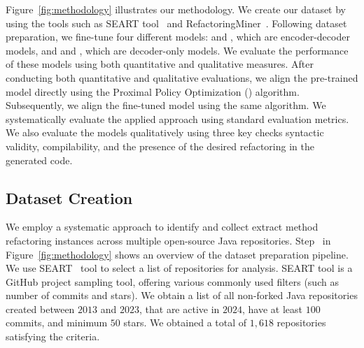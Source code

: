 Figure~\ref{fig:methodology} illustrates our methodology. We create our dataset by using the tools such as SEART tool~\cite{seart2021data} and RefactoringMiner~\cite{Tsantalis:TSE:2020:RefactoringMiner2.0, Tsantalis:ICSE:2018:RefactoringMiner}.
Following dataset preparation, we fine-tune four different models: \codetf{} and \plbart{}, which are encoder-decoder models, and \codegpt{} and \codegen{}, which are decoder-only models. We evaluate the performance of these models using both quantitative and qualitative measures. After conducting both quantitative and qualitative evaluations, we align the pre-trained model directly using the Proximal Policy Optimization (\ppo{}) algorithm. Subsequently, we align the fine-tuned model using the same \ppo{} algorithm.
We systematically evaluate the applied approach using standard evaluation metrics. We also evaluate the models qualitatively using three key checks \ie{} syntactic validity, compilability, and the presence of the desired refactoring in the generated code.

\subsection{Dataset Creation} \label{section:dataset_creation}

We employ a systematic approach to identify and collect extract method refactoring instances across multiple open-source Java repositories. Step~ in Figure~\ref{fig:methodology} shows an overview of the dataset preparation pipeline. 
We use SEART~\cite{seart2021data} tool to select a  list of repositories for analysis. 
SEART tool is a GitHub project sampling tool,
offering various commonly used filters (such as number of commits and stars).
We obtain a list of all non-forked Java repositories 
created between $2013$ and $2023$, that are active in $2024$, 
have at
least $100$ commits,
and minimum $50$ stars. 
We obtained a total of $1,618$ repositories
satisfying the criteria.

